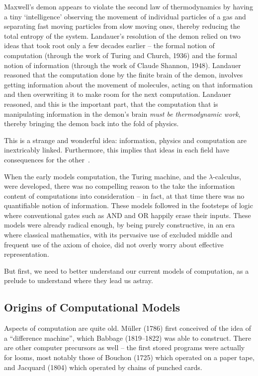 \documentclass{article}
\begin{document}
Maxwell's demon appears to violate the second law of thermodynamics by
having a tiny `intelligence' observing the movement of individual
particles of a gas and separating fast moving particles from slow
moving ones, thereby reducing the total entropy of the
system. Landauer's resolution of the demon relied on two ideas that
took root only a few decades earlier -- the formal notion of
computation (through the work of Turing and Church, 1936) and the
formal notion of information (through the work of Claude Shannon,
1948). Landauer reasoned that the computation done by the finite brain
of the demon, involves getting information about the movement of
molecules, acting on that information and then overwriting it to make
room for the next computation.  Landauer reasoned, and this is the
important part, that the computation that is manipulating information
in the demon's brain \textit{must be thermodynamic work}, thereby
bringing the demon back into the fold of physics.

This is a strange and wonderful idea: information, physics and
computation are inextricably linked. Furthermore, this implies that
ideas in each field have consequences for the
other~\cite{bennett:1973:lrc,bennett1985fundamental,bennett2010notes,bennett2003notes,baker:1992:nft,dblp:conf/csfw/malacarias12}.

When the early models computation, the Turing machine, and the
$\lambda$-calculus, were developed, there was no compelling reason to the
take the information content of computations into
consideration -- in fact, at that time there was no quantifiable
notion of information. These models followed in the footsteps of logic
where conventional gates such as AND and OR happily erase their
inputs. These models were already radical enough, by being purely
constructive, in an era where classical mathematics, with its
pervasive use of excluded middle and frequent use of the axiom of
choice, did not overly worry about effective representation.

But first, we need to better understand our current models of
computation, as a prelude to understand where they lead us astray.

\subsection{Origins of Computational Models}

Aspects of computation are
quite old. M\"{u}ller (1786) first conceived of the idea of a
``difference machine'', which Babbage (1819--1822) was able to
construct. There are other computer precursors as well -- the first
stored programs were actually for looms, most notably those of
Bouchon (1725) which operated on a paper tape, and Jacquard (1804)
which operated by chains of punched cards.
\end{document}
